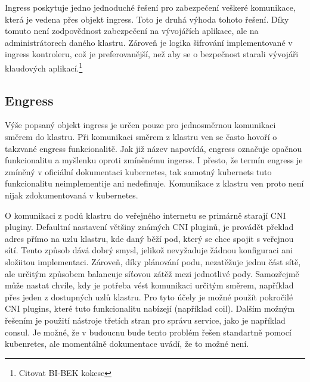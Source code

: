 Ingress poskytuje jedno jednoduché řešení pro zabezpečení veškeré komunikace, která je vedena přes objekt ingress. Toto je druhá výhoda tohoto řešení. Díky tomuto není zodpovědnost zabezpečení na vývojářích aplikace, ale na administrátorech daného klastru. Zároveň je logika šifrování implementované v ingress kontroleru, což je preferovanější, než aby se o bezpečnost starali vývojáři klaudových aplikací.\footnote{Citovat BI-BEK kokese}

\subsection{Engress}
Výše popsaný objekt ingress je určen pouze pro jednosměrnou komunikaci směrem do klastru. Při komunikaci směrem z klastru ven se často hovoří o takzvané engress funkcionalitě. Jak již název napovídá, engress označuje opačnou funkcionalitu a myšlenku oproti zmíněnému ingerss. I přesto, že termín engress je zmíněný v oficiální dokumentaci kubernetes, tak samotný kubernets tuto funkcionalitu neimplementije ani nedefinuje. Komunikace z klastru ven proto není nijak zdokumentovaná v kubernetes.

O komunikaci z podů klastru do veřejného internetu se primárně starají CNI pluginy. Defaultní nastavení většiny známých CNI pluginů, je provádět překlad adres přímo na uzlu klastru, kde daný běží pod, který se chce spojit s veřejnou sítí. Tento způsob dává dobrý smysl, jelikož nevyžaduje žádnou konfiguraci ani složiitou implementaci. Zároveň, díky plánování podu, nezatěžuje jednu část sítě, ale určitým způsobem balancuje síťovou zátěž mezi jednotlivé pody. Samozřejmě může nastat chvíle, kdy je potřeba vést komunikaci určitým směrem, například přes jeden z dostupných uzlů klastru. Pro tyto účely je možné použít pokročilé CNI plugins, které tuto funkcionalitu nabízejí (například coil)\cite{yamamoto_2020_introducing}. Dalším možným řešením je použití nástroje třetích stran pro správu service, jako je například consul. Je možné, že v budoucnu bude tento problém řešen standartně pomocí kubenretes, ale momentálně dokumentace uvádí, že to možné není.\cite{a2022_network}




